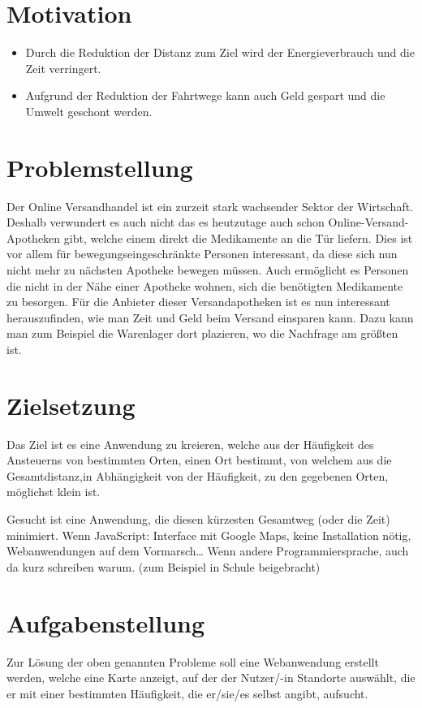\documentclass[a4paper, twoside, 12pt]{scrreprt}
\begin{document}
\section{Motivation}
\begin{itemize}
\item Durch die Reduktion der Distanz zum Ziel wird der Energieverbrauch und die Zeit verringert.
\item Aufgrund der Reduktion der Fahrtwege kann auch Geld gespart und die Umwelt geschont werden.
\end{itemize}
\section{Problemstellung}
Der Online Versandhandel ist ein zurzeit stark wachsender Sektor der Wirtschaft.
Deshalb verwundert es auch nicht das es heutzutage auch schon Online-Versand-Apotheken gibt, welche einem direkt die Medikamente an die Tür liefern.
Dies ist vor allem für bewegungseingeschränkte Personen interessant, da diese sich nun nicht mehr zu nächsten Apotheke bewegen müssen.
Auch ermöglicht es Personen die nicht in der Nähe einer Apotheke wohnen, sich die benötigten Medikamente zu besorgen.
Für die Anbieter dieser Versandapotheken ist es nun interessant herauszufinden, wie man Zeit und Geld beim Versand einsparen kann.
Dazu kann man zum Beispiel die Warenlager dort plazieren, wo die Nachfrage am größten ist.
\section{Zielsetzung}
Das Ziel ist es eine Anwendung zu kreieren, welche aus der Häufigkeit des Ansteuerns von bestimmten Orten, einen Ort bestimmt, von welchem aus die Gesamtdistanz,in Abhängigkeit von der Häufigkeit, zu den gegebenen Orten, möglichst klein ist.

Gesucht ist eine Anwendung, die diesen kürzesten Gesamtweg (oder die Zeit) minimiert.
Wenn JavaScript: Interface mit Google Maps, keine Installation nötig, Webanwendungen auf dem Vormarsch…
Wenn andere Programmiersprache, auch da kurz schreiben warum.
(zum Beispiel in Schule beigebracht)
\section{Aufgabenstellung}
Zur Lösung der oben genannten Probleme soll eine Webanwendung erstellt werden, welche eine Karte anzeigt, auf der der Nutzer/-in Standorte auswählt, die er mit einer bestimmten Häufigkeit, die er/sie/es selbst angibt, aufsucht.
\end{document}
